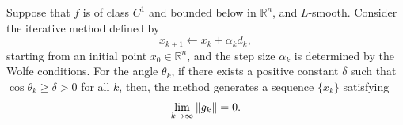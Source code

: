 \documentclass[0_en]{subfiles}
\begin{document}
\begin{theorem}
    \label{thm:line-search-global-convergence}
    Suppose that $f$ is of class $C^1$ and bounded below in $\mathbb{R}^n$, and $L$-smooth.
    Consider the iterative method defined by
    \begin{equation*}
        x_{k+1} \gets x_k + \alpha_k d_k,
    \end{equation*}
    starting from an initial point $x_0 \in \mathbb{R}^n$, and the step size $\alpha_k$ is determined by the Wolfe conditions.
    For the angle $\theta_k$, if there exists a positive constant $\delta$ such that
    $\cos \theta_k \geq \delta > 0$ for all $k$,
    then, the method generates a sequence $\{x_k\}$ satisfying
    \begin{equation*}
        \lim_{k \to \infty} \norm{g_k} = 0.
    \end{equation*}
\end{theorem}
\end{document}
